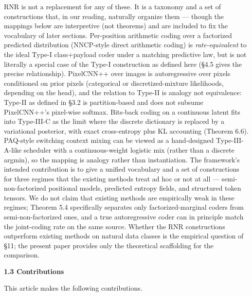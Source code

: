 \documentclass[
]{article}
\begin{document}
RNR is not a replacement for any of these. It is a taxonomy and a set
of constructions that, in our reading, naturally organize them ---
though the mappings below are interpretive (not theorems) and are
included to fix the vocabulary of later sections. Per-position
arithmetic coding over a factorized predicted distribution
(NNCP-style direct arithmetic coding) is \emph{rate-equivalent} to
the ideal Type-I class+payload coder under a matching predictive
law, but is not literally a special case of the Type-I construction
as defined here (§4.5 gives the precise relationship). PixelCNN++
over images is autoregressive over pixels conditioned on prior
pixels (categorical or discretized-mixture likelihoods, depending
on the head), and the relation to Type-II is analogy not
equivalence: Type-II as defined in §3.2 is partition-based and does
not subsume PixelCNN++'s pixel-wise softmax. Bits-back coding
on a continuous latent fits into Type-III-C as the limit where the
discrete dictionary is replaced by a variational posterior, with
exact cross-entropy plus KL accounting (Theorem 6.6). PAQ-style
switching context mixing can be viewed as a hand-designed
Type-III-A-like scheduler with a continuous-weight logistic mix
(rather than a discrete argmin), so the mapping is analogy rather
than instantiation.
The framework's intended contribution is to give a unified vocabulary
and a set of constructions for three regimes that the existing methods
treat ad hoc or not at all --- semi-non-factorized positional models,
predicted entropy fields, and structured token tensors. We do not
claim that existing methods are empirically weak in these regimes;
Theorem 5.4 specifically separates only factorized-marginal coders
from semi-non-factorized ones, and a true autoregressive coder can in
principle match the joint-coding rate on the same source. Whether the
RNR constructions outperform existing methods on natural data classes
is the empirical question of §11; the present paper provides only the
theoretical scaffolding for the comparison.

\textbf{1.3 Contributions}

This article makes the following contributions.
\end{document}

